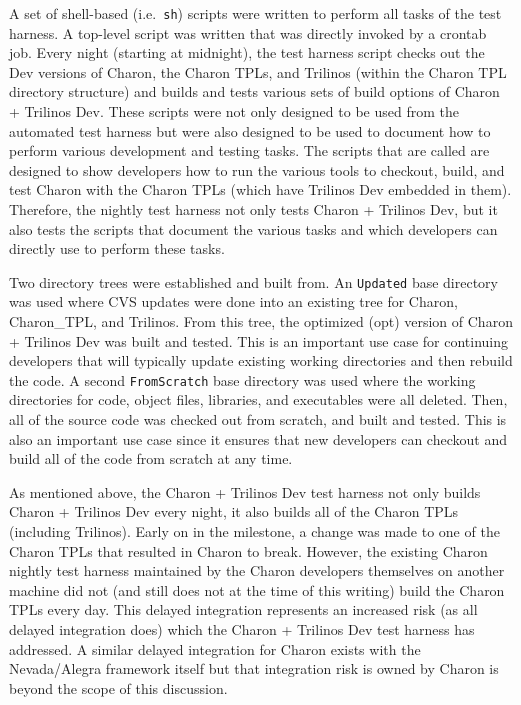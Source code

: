 \documentclass[pdf,ps2pdf,11pt]{SANDreport}
\begin{document}
A set of shell-based (i.e.\ {}\texttt{sh}) scripts were written to perform all
tasks of the test harness.  A top-level script was written that was directly
invoked by a crontab job.  Every night (starting at midnight), the test
harness script checks out the Dev versions of Charon, the Charon TPLs, and
Trilinos (within the Charon TPL directory structure) and builds and tests
various sets of build options of Charon + Trilinos Dev.  These scripts were
not only designed to be used from the automated test harness but were also
designed to be used to document how to perform various development and testing
tasks.  The scripts that are called are designed to show developers how to run
the various tools to checkout, build, and test Charon with the Charon TPLs
(which have Trilinos Dev embedded in them).  Therefore, the nightly test
harness not only tests Charon + Trilinos Dev, but it also tests the scripts
that document the various tasks and which developers can directly use to
perform these tasks.

Two directory trees were established and built from.  An {}\texttt{Updated}
base directory was used where CVS updates were done into an existing tree for
Charon, Charon\_TPL, and Trilinos.  From this tree, the optimized (opt)
version of Charon + Trilinos Dev was built and tested.  This is an important
use case for continuing developers that will typically update existing working
directories and then rebuild the code.  A second {}\texttt{FromScratch} base
directory was used where the working directories for code, object files,
libraries, and executables were all deleted.  Then, all of the source code was
checked out from scratch, and built and tested.  This is also an important use
case since it ensures that new developers can checkout and build all of the
code from scratch at any time.

As mentioned above, the Charon + Trilinos Dev test harness not only builds
Charon + Trilinos Dev every night, it also builds all of the Charon TPLs
(including Trilinos).  Early on in the milestone, a change was made to one of
the Charon TPLs that resulted in Charon to break.  However, the existing
Charon nightly test harness maintained by the Charon developers themselves on
another machine did not (and still does not at the time of this writing) build
the Charon TPLs every day.  This delayed integration represents an increased
risk (as all delayed integration does) which the Charon + Trilinos Dev test
harness has addressed.  A similar delayed integration for Charon exists with
the Nevada/Alegra framework itself but that integration risk is owned by
Charon is beyond the scope of this discussion.
\end{document}

